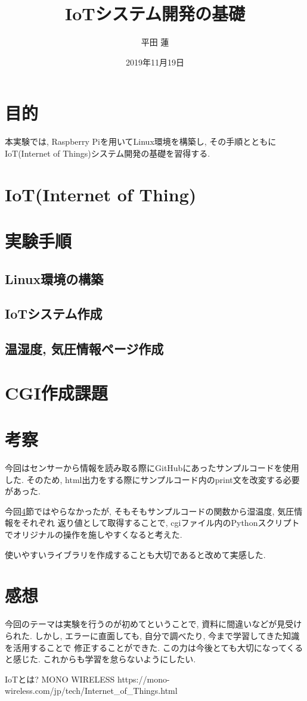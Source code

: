 \documentclass[titlepage]{jsarticle}
\title{IoTシステム開発の基礎}
\author{平田 蓮}
\date{2019年11月19日}
\begin{document}
\maketitle
\section{目的}
    本実験では, Raspberry Piを用いてLinux環境を構築し, その手順とともにIoT(Internet of Things)システム開発の基礎を習得する.

\section{IoT(Internet of Thing)}
    

\section{実験手順}
    \subsection{Linux環境の構築}
        

    \subsection{IoTシステム作成}

    \subsection{温湿度, 気圧情報ページ作成}

\section{CGI作成課題} \label{kadai}


\section{考察}
    今回はセンサーから情報を読み取る際にGitHubにあったサンプルコードを使用した.
    そのため, html出力をする際にサンプルコード内のprint文を改変する必要があった.

    今回\ref{kadai}節ではやらなかったが, そもそもサンプルコードの関数から湿温度, 気圧情報をそれぞれ
    返り値として取得することで, cgiファイル内のPythonスクリプトでオリジナルの操作を施しやすくなると考えた.

    使いやすいライブラリを作成することも大切であると改めて実感した.

\section{感想}
    今回のテーマは実験を行うのが初めてということで, 資料に間違いなどが見受けられた.
    しかし, エラーに直面しても, 自分で調べたり, 今まで学習してきた知識を活用することで
    修正することができた. この力は今後とても大切になってくると感じた.
    これからも学習を怠らないようにしたい.

\begin{thebibliography}{99}
     IoTとは? MONO WIRELESS https://mono-wireless.com/jp/tech/Internet\_of\_Things.html
\end{thebibliography}
\end{document}
